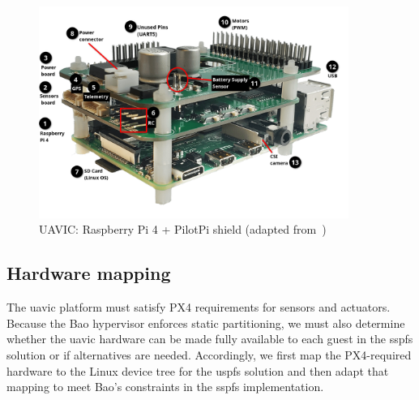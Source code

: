 \begin{figure}[!hbt]
  \centering
  \includegraphics[width=0.9\textwidth]{./img/png/pilotpi-annotated}
  \caption[UAVIC: Raspberry Pi 4 + PilotPi shield]{UAVIC: Raspberry Pi 4 +
    PilotPi shield (adapted from~\cite{px4-pilotpi})\footnotemark}
  \label{fig:pilotpi-annot}
\end{figure}
%

\subsection{Hardware mapping}
\label{sec:hardware-mapping}
The \gls{uavic} platform must satisfy PX4 requirements for sensors and
actuators. Because the Bao hypervisor enforces static partitioning, we must also
determine whether the \gls{uavic} hardware can be made fully available to each
guest in the \gls{sspfs} solution or if alternatives are needed.
Accordingly, we first map the PX4-required hardware to the Linux device tree for
the \gls{uspfs} solution and then adapt that mapping to meet Bao's constraints
in the \gls{sspfs} implementation.

